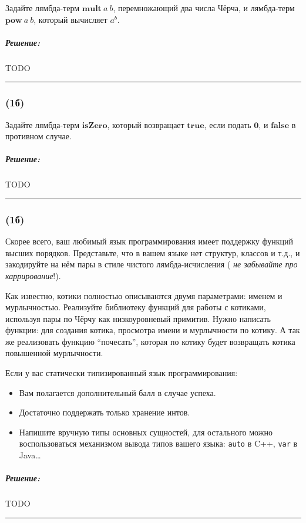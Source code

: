 \documentclass{article}
\newenvironment{proof}{\subparagraph{\hspace{-1em}Решение:\newline}}{\par\noindent\rule{\textwidth}{0.4pt}}
\newcommand{\term}[1]{\mathbf{#1}}
\renewcommand{\emph}[1]{{\color{blue} \textit{#1}}}
\begin{document}
    Задайте лямбда-терм $\term{mult}~a~b$, перемножающий два числа Чёрча, и лямбда-терм $\term{pow}~a~b$, который вычисляет $a^b$.

    \begin{proof}
        TODO %
    \end{proof}

    \subsubsection{(1б)}

    Задайте лямбда-терм $\term{isZero}$, который возвращает $\term{true}$, если подать $\term{0}$, и $\term{false}$ в противном случае.

    \begin{proof}
        TODO %
    \end{proof}

    \subsubsection{(1б)}

    Скорее всего, ваш любимый язык программирования имеет поддержку функций высших порядков.
    Представьте, что в вашем языке нет структур, классов и т.д., и закодируйте на нём пары в стиле чистого лямбда-исчисления (\emph{не забывайте про каррирование}!).

    Как известно, котики полностью описываются двумя параметрами: именем и мурлычностью.
    Реализуйте библиотеку функций для работы с котиками, используя пары по Чёрчу как низкоуровневый примитив.
    Нужно написать функции: для создания котика, просмотра имени и мурлычности по котику.
    А так же реализовать функцию ``почесать'', которая по котику будет возвращать котика повышенной мурлычности.

    Если у вас статически типизированный язык программирования:
    \begin{itemize}
        \item Вам полагается дополнительный балл в случае успеха.
        \item Достаточно поддержать только хранение интов.
        \item Напишите вручную типы основных сущностей, для остального можно воспользоваться механизмом вывода типов вашего языка: \texttt{auto} в C++, \texttt{var} в Java\ldots
    \end{itemize}

    \begin{proof}
        TODO %
    \end{proof}
\end{document}
